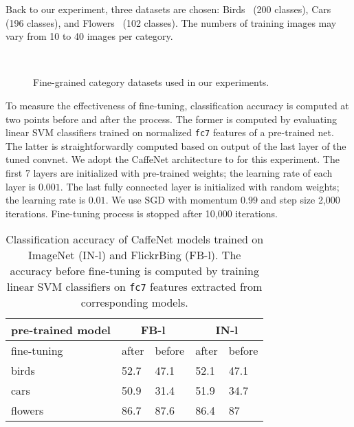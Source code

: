 \documentclass[preprint,12pt]{elsarticle}
\newcommand{\cmark}{\ding{51}}%
\newcommand{\xmark}{\ding{55}}%
\begin{document}
Back to our experiment, three datasets are chosen: Birds~\cite{WahCUB_200_2011} (200 classes), Cars~\cite{krause20133d} (196 classes), and Flowers~\cite{Nilsback08} (102 classes). The numbers of training images may vary from 10 to 40 images per category.
\begin{figure}[!t]
\centering 
{}\,
\,
\\
\caption{Fine-grained category datasets used in our experiments.}
\end{figure}

To measure the effectiveness of fine-tuning, classification accuracy is computed at two points before and after the process. The former is computed by evaluating linear SVM classifiers trained on normalized \texttt{fc7} features of a pre-trained net. The latter is straightforwardly computed based on output of the last layer of the tuned convnet. We adopt the CaffeNet architecture to for this experiment. The first 7 layers are initialized with pre-trained weights; the learning rate of each layer is $0.001$. The last fully connected layer is initialized with random weights; the learning rate is $0.01$. We use SGD with momentum $0.99$ and step size 2,000 iterations. Fine-tuning process is stopped after 10,000 iterations.
\begin{table}
\begin{centering}
\begin{tabular}{l|ll|ll}
pre-trained model & \multicolumn{2}{c}{FB-l} & \multicolumn{2}{c}{IN-l} \tabularnewline
\hline
fine-tuning & after & before & after & before \tabularnewline
 \hline\hline
birds~\cite{WahCUB_200_2011} & 52.7 & 47.1 & 52.1 & 47.1 \tabularnewline
cars~\cite{krause20133d} & 50.9 & 31.4 & 51.9 & 34.7 \tabularnewline
flowers~\cite{Nilsback08} & 86.7 & 87.6 & 86.4 & 87 \tabularnewline
\end{tabular}
\par\end{centering}
\caption{Classification accuracy of CaffeNet models trained on ImageNet (IN-l) and FlickrBing (FB-l). The accuracy before fine-tuning is computed by training linear SVM classifiers on \texttt{fc7} features extracted from corresponding models.}
\label{table:finecateg}
\end{table}
\end{document}
